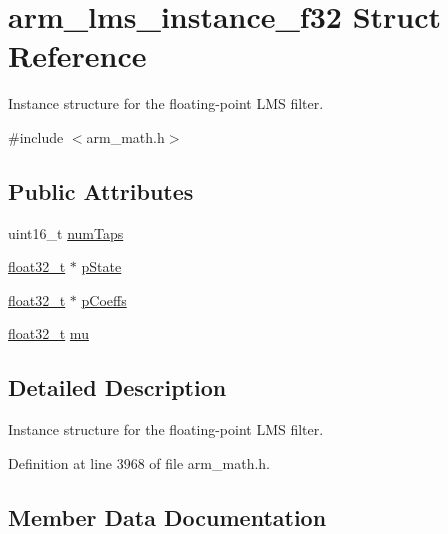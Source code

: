 \hypertarget{structarm__lms__instance__f32}{}\section{arm\+\_\+lms\+\_\+instance\+\_\+f32 Struct Reference}
\label{structarm__lms__instance__f32}


Instance structure for the floating-\/point L\+MS filter.  




{\ttfamily \#include $<$arm\+\_\+math.\+h$>$}

\subsection*{Public Attributes}
\begin{DoxyCompactItemize}
\item 
uint16\+\_\+t \hyperlink{structarm__lms__instance__f32_af73880d9009982f5d14529869494ec3d}{num\+Taps}
\item 
\hyperlink{arm__math_8h_a4611b605e45ab401f02cab15c5e38715}{float32\+\_\+t} $\ast$ \hyperlink{structarm__lms__instance__f32_aaf94285be2f99b5b9af40bea8dcb14b9}{p\+State}
\item 
\hyperlink{arm__math_8h_a4611b605e45ab401f02cab15c5e38715}{float32\+\_\+t} $\ast$ \hyperlink{structarm__lms__instance__f32_a4795c6f7d3f17cec15c2fd09f66edd1a}{p\+Coeffs}
\item 
\hyperlink{arm__math_8h_a4611b605e45ab401f02cab15c5e38715}{float32\+\_\+t} \hyperlink{structarm__lms__instance__f32_ae2af43d74c93dba16b876e10c97a5b99}{mu}
\end{DoxyCompactItemize}


\subsection{Detailed Description}
Instance structure for the floating-\/point L\+MS filter. 

Definition at line 3968 of file arm\+\_\+math.\+h.



\subsection{Member Data Documentation}
\mbox{\label{structarm__lms__instance__f32_ae2af43d74c93dba16b876e10c97a5b99}} 
